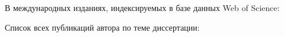 В международных изданиях, индексируемых в базе данных Web of Science:
\begin{refsection}
\nocite{*}
\printbibliography[
    keyword=wos,
    heading=none,
    resetnumbers=true
]
\end{refsection}
Список всех публикаций автора по теме диссертации:
\begin{refsection}
\nocite{*}
\printbibliography[
    keyword=own,
    heading=none,
    resetnumbers=true
]
\end{refsection}
